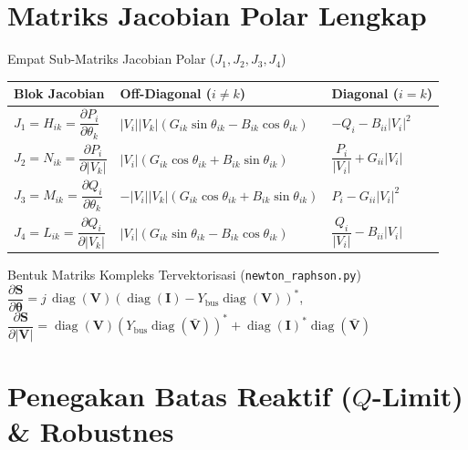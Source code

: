 \documentclass[aspectratio=169,10pt]{beamer}
\begin{document}
\section{Matriks Jacobian Polar Lengkap}

\begin{frame}{Empat Sub-Matriks Jacobian Polar ($J_1, J_2, J_3, J_4$)}
  \scriptsize
  \begin{center}
  \begin{tabular}{@{}lll@{}}
    \toprule
    \textbf{Blok Jacobian} & \textbf{Off-Diagonal ($i \neq k$)} & \textbf{Diagonal ($i = k$)} \\
    \midrule
    $J_1 = H_{ik} = \dfrac{\partial P_i}{\partial \theta_k}$ & $|V_i||V_k|(G_{ik}\sin\theta_{ik} - B_{ik}\cos\theta_{ik})$ & $-Q_i - B_{ii}|V_i|^2$ \\[7pt]
    $J_2 = N_{ik} = \dfrac{\partial P_i}{\partial |V_k|}$ & $|V_i|(G_{ik}\cos\theta_{ik} + B_{ik}\sin\theta_{ik})$ & $\dfrac{P_i}{|V_i|} + G_{ii}|V_i|$ \\[7pt]
    $J_3 = M_{ik} = \dfrac{\partial Q_i}{\partial \theta_k}$ & $-|V_i||V_k|(G_{ik}\cos\theta_{ik} + B_{ik}\sin\theta_{ik})$ & $P_i - G_{ii}|V_i|^2$ \\[7pt]
    $J_4 = L_{ik} = \dfrac{\partial Q_i}{\partial |V_k|}$ & $|V_i|(G_{ik}\sin\theta_{ik} - B_{ik}\cos\theta_{ik})$ & $\dfrac{Q_i}{|V_i|} - B_{ii}|V_i|$ \\
    \bottomrule
  \end{tabular}
  \end{center}
  \normalsize
  \vspace{0.2cm}
  \begin{block}{Bentuk Matriks Kompleks Tervektorisasi (\texttt{newton\_raphson.py})}
    $\dfrac{\partial \mathbf{S}}{\partial \boldsymbol{\theta}} = j\,\operatorname{diag}(\mathbf{V})\left(\operatorname{diag}(\mathbf{I}) - Y_{\text{bus}}\operatorname{diag}(\mathbf{V})\right)^*$, \quad
    $\dfrac{\partial \mathbf{S}}{\partial |\mathbf{V}|} = \operatorname{diag}(\mathbf{V})\left(Y_{\text{bus}}\operatorname{diag}(\bar{\mathbf{V}})\right)^* + \operatorname{diag}(\mathbf{I})^*\operatorname{diag}(\bar{\mathbf{V}})$
  \end{block}
\end{frame}

\section{Penegakan Batas Reaktif ($Q$-Limit) \& Robustnes}
\end{document}
